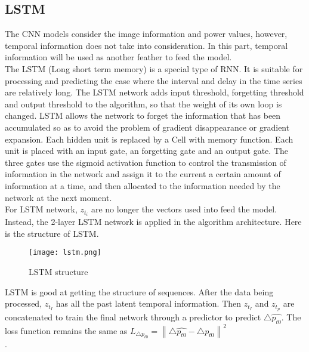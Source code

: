 \documentclass{elegantpaper}
\begin{document}
\subsection{LSTM}

The CNN models consider the image information and power values, however, temporal information does not take into consideration. In this part, temporal information will be used as another feather to feed the model.\\[2ex]

The LSTM (Long short term memory) is a special type of RNN.\cite{liu2018wind} It is suitable for processing and predicting the case where the interval and delay in the time series are relatively long.\cite{li2018prediction} The LSTM network adds input threshold, forgetting threshold and output threshold to the algorithm, so that the weight of its own loop is changed.\cite{gers1999learning} LSTM allows the network to forget the information that has been accumulated so as to avoid the problem of gradient disappearance or gradient expansion. Each hidden unit is replaced by a Cell with memory function. Each unit is placed with an input gate, an forgetting gate and an output gate.\cite{wang2018research} The three gates use the sigmoid activation function to control the transmission of information in the network and assign it to the current a certain amount of information at a time, and then allocated to the information needed by the network at the next moment.\cite{zhang2018use} \\[2ex]

For LSTM network,  $z_{t_{i}}$ are no longer the vectors used into feed the model. Instead, the 2-layer LSTM network is applied in the algorithm architecture. Here is the structure of LSTM.

\begin{figure}[!ht]
	\centering
	\texttt{[image: lstm.png]}
	\caption{LSTM structure\label{fig:lstm}}
\end{figure}

LSTM is good at getting the structure of sequences. After the data being processed, $z_{t_{I}}$ has all the past latent temporal information. Then $z_{t_{I}}$ and $z_{t_{p}}$ are concatenated to train the final network through a predictor to predict  $\bigtriangleup \hat{p_{t0}}$. The loss function remains the same as $L_{\bigtriangleup p_{t0}}=\left \| \bigtriangleup \hat{p_{t0}}-\bigtriangleup p_{t0} \right \|  ^{2}$ \\.
\end{document}
